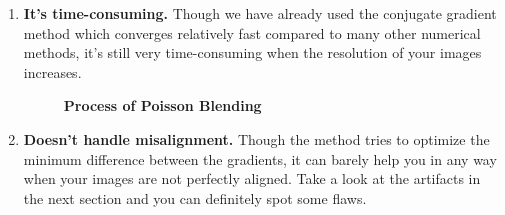 \documentclass[a4paper]{article}
\begin{document}
\begin{enumerate}
  \item {\bf It's time-consuming.} Though we have already used the conjugate
    gradient method which converges relatively fast compared to many other
    numerical methods, it's still very time-consuming when the resolution of your
    images increases.

    \clearpage
\begin{figure}[h]
  \centering
  \hfill
  \hfill
  \hfill
  \hfill
  \caption{\textbf{Process of Poisson Blending}}
  \label{fig:poisson}
\end{figure}
    \clearpage
  \item {\bf Doesn't handle misalignment.} Though the method tries to optimize
    the minimum difference between the gradients, it can barely help you in any way
    when your images are not perfectly aligned. Take a look at the artifacts in
    the next section and you can definitely spot some flaws.
\end{enumerate}
\end{document}
